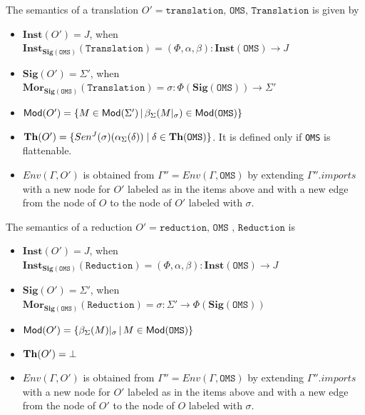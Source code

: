 \documentclass[10pt,fleqn,%
\ifpretendfinal
final%
\else
draft%
\fi,
]{scrreprt}
\newcommand*{\syntax}[1]{\texttt{#1}}
\newcommand{\Sig}{\mathbf{Sig}}
\newcommand{\Mor}{\mathbf{Mor}}
\newcommand{\Inst}{\ensuremath{\mathbf{Inst}}}
\begin{document}

The semantics of a translation $O'= \syntax{translation, OMS, Translation}$ is given by
\begin{itemize}
 \item $\Inst(O') = J$, when $\Inst_{\Sig(\syntax   {OMS})}(\syntax{Translation}) = (\Phi, \alpha, \beta) : \Inst(\syntax{OMS}) \to J$ 
 \item $\Sig(O') = \Sigma'$, when $\Mor_{\Sig(\syntax   {OMS})}(\syntax{Translation}) = \sigma:\Phi(\Sig(\syntax   {OMS}))\to \Sigma'$
 \item $\Mod(O') = \{M \in \Mod(\Sigma') \,|\, \beta_\Sigma(M\forget\sigma)\in \Mod(\syntax{OMS})\}$
 \item $\Th(O') = \{   Sen^J(\sigma)(\alpha_\Sigma(\delta))  \mid \delta \in \Th(\syntax{OMS}) \}$. It is defined only if \syntax{OMS} is flattenable.
 \item $Env(\Gamma, O')$ is obtained from 
       $\Gamma'' = Env(\Gamma, \syntax{OMS})$
       by extending $\Gamma''.imports$
        with a new node for $O'$ labeled as in the items above
        and with a new edge from the node of $O$ to the node of $O'$ labeled with
        $\sigma$.
\end{itemize}

The semantics of a reduction
$O' = \syntax{reduction, OMS , Reduction}$
is
\begin{itemize}

  \item $\Inst(O') = J$, when $\Inst_{\Sig(\syntax{OMS})}(\syntax{Reduction})
  = (\Phi, \alpha, \beta) : \Inst(\syntax{OMS}) \to J$
  \item $\Sig(O') = \Sigma'$, when
   $\Mor_{\Sig(\syntax{OMS})}(\syntax{Reduction}) = \sigma:\Sigma'\to
    \Phi(\Sig(\syntax{OMS}))$
  \item $\Mod(O') = \{\beta_\Sigma(M)\forget{\sigma} \,|\, M\in \Mod(\syntax{OMS})\}$
  \item $\mathbf{Th}(O') = \bot$
  \item $Env(\Gamma, O')$ is obtained from 
       $\Gamma'' = Env(\Gamma, \syntax{OMS})$
       by extending $\Gamma''.imports$
        with a new node for $O'$ labeled as in the items above
        and with a new edge from the node of $O'$ to the node of $O$ labeled with
        $\sigma$.

\end{itemize}

\end{document}
